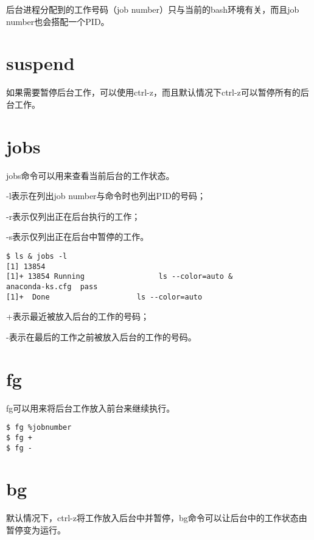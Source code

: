 后台进程分配到的工作号码（job number）只与当前的bash环境有关，而且job number也会搭配一个PID。

\section{suspend}


如果需要暂停后台工作，可以使用ctrl-z，而且默认情况下ctrl-z可以暂停所有的后台工作。

\section{jobs}

jobs命令可以用来查看当前后台的工作状态。



\begin{compactitem}
\item -l表示在列出job number与命令时也列出PID的号码；
\item -r表示仅列出正在后台执行的工作；
\item -s表示仅列出正在后台中暂停的工作。
\end{compactitem}


\begin{verbatim}
$ ls & jobs -l
[1] 13854
[1]+ 13854 Running                 ls --color=auto &
anaconda-ks.cfg  pass
[1]+  Done                    ls --color=auto
\end{verbatim}


\begin{compactitem}
\item +表示最近被放入后台的工作的号码；
\item -表示在最后的工作之前被放入后台的工作的号码。
\end{compactitem}

\section{fg}

fg可以用来将后台工作放入前台来继续执行。

\begin{verbatim}
$ fg %jobnumber
$ fg +
$ fg -
\end{verbatim}

\section{bg} 

默认情况下，ctrl-z将工作放入后台中并暂停，bg命令可以让后台中的工作状态由暂停变为运行。



